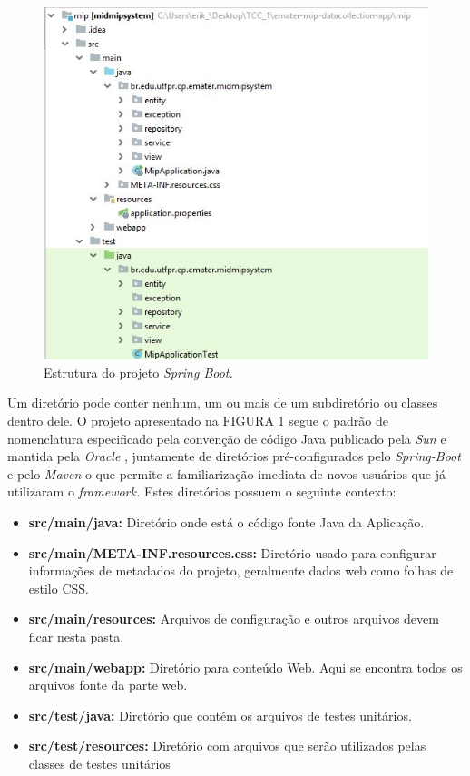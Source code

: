 \begin{figure}[H]
	\centering
	\includegraphics[]{dados/figuras/estruturaDoProjeto.JPG}
	\caption{Estrutura do projeto \textit{Spring Boot.}}
	\label{estruturaProjeto}
\end{figure}

    Um diretório pode conter nenhum, um ou mais de um subdiretório ou classes dentro dele. O projeto apresentado na FIGURA \ref{estruturaProjeto}  segue o padrão de nomenclatura especificado  pela convenção de código Java publicado pela \textit{Sun} e mantida pela \textit{Oracle} \cite{Oracle}, juntamente de diretórios pré-configurados pelo \textit{Spring-Boot} e pelo \textit{Maven} o que permite a familiarização imediata de novos usuários que já utilizaram o \textit{framework.} Estes diretórios possuem o seguinte contexto: 



\begin{itemize}
    \item \textbf{src/main/java:} Diretório onde está o código fonte Java da Aplicação.
\item \textbf{src/main/META-INF.resources.css:} Diretório usado para configurar informações de metadados do projeto, geralmente dados web como folhas de estilo CSS.
\item \textbf{src/main/resources:} Arquivos de configuração e outros arquivos devem ficar nesta pasta.
\item \textbf{src/main/webapp:} Diretório para conteúdo Web. Aqui se encontra todos os arquivos fonte da parte web.
\item \textbf{src/test/java:} Diretório que contém os arquivos de testes unitários.
\item \textbf{src/test/resources:} Diretório com arquivos que serão utilizados pelas classes de testes unitários
\end{itemize}


